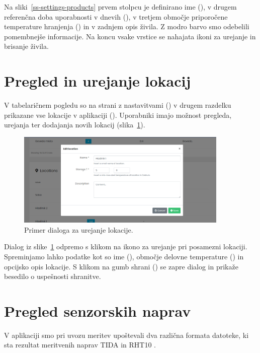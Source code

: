 \documentclass[a4paper, 12pt]{book}
\begin{document}
Na sliki~\ref{ss-settings-products} prvem stolpcu je definirano ime (), v drugem referenčna doba uporabnosti v dnevih (), v tretjem območje priporočene temperature hranjenja () in v zadnjem opis živila. Z modro barvo smo odebelili pomembnejše informacije. Na koncu vsake vrstice se nahajata ikoni za urejanje in brisanje živila. 

\newpage

\section{Pregled in urejanje lokacij}

V tabelaričnem pogledu so na strani z nastavitvami () v drugem razdelku prikazane vse lokacije v aplikaciji (). Uporabniki imajo možnost pregleda, urejanja ter dodajanja novih lokacij (slika~\ref{ss-settings-location}).


\begin{figure}[h]
\begin{center}
\includegraphics[width=0.9\textwidth]{slike/location_edit.png}
\end{center}
\caption{Primer dialoga za urejanje lokacije.}
\label{ss-settings-location}
\end{figure}

Dialog iz slike~\ref{ss-settings-location} odpremo s klikom na ikono za urejanje pri posamezni lokaciji. Spreminjamo lahko podatke kot so ime (), območje delovne temperature () in opcijsko opis lokacije. S klikom na gumb shrani () se zapre dialog in prikaže besedilo o uspešnosti shranitve.


\section{Pregled senzorskih naprav}

V aplikaciji smo pri uvozu meritev upoštevali dva različna formata datoteke, ki sta rezultat meritvenih naprav TIDA \cite{tida-dialogger} in RHT10 \cite{rht10-dialogger}.
\end{document}
